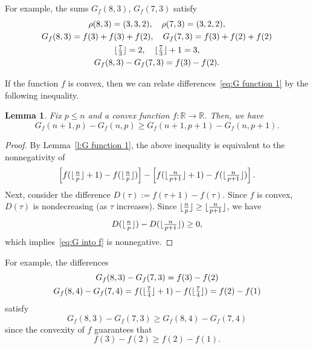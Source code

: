 \documentclass[12pt]{amsart}
\DeclarePairedDelimiter\floor{\lfloor}{\rfloor}
\newtheorem{lem}[thm]{Lemma}
\theoremstyle{definition}
\numberwithin{equation}{section}
\newcommand{\defeq}{:=}
\begin{document}
For example, the sums $G_f(8,3)$, $G_f(7,3)$ satisfy
\begin{equation}
    \begin{gathered}
        \rho(8,3) = (3,3,2), \quad \rho(7,3) = (3,2,2), \\
        G_f(8,3) = f(3) + f(3) + f(2), \quad G_f(7,3) = f(3) + f(2) + f(2) \\
        \floor{\tfrac{7}{3}} = 2, \quad \floor{\tfrac{7}{3}} +1 = 3, \\
        G_f(8,3) - G_f(7,3) = f(3) - f(2).
    \end{gathered}
\end{equation}

If the function $f$ is convex, then we can relate differences~\eqref{eq:G function 1} by the following inequality.

\begin{lem}\label{l:G function 2}
    Fix $p \leq n$ and a convex function $f: \mathbb R \rightarrow \mathbb R$. Then, we have \begin{equation}\label{eq:Delta n increasing}
        G_f(n+1,p) - G_f(n,p) \geq G_f(n+1,p+1)- G_f(n,p+1).
    \end{equation}
\end{lem}

\begin{proof}
    By Lemma~\ref{l:G function 1}, the above inequality is equivalent to the nonnegativity of
    \begin{equation}\label{eq:G into f}
        \left[f(\floor{\tfrac{n}{p}} +1) - f(\floor{\tfrac{n}{p}})\right] - \left[f(\floor{\tfrac{n}{p+1}} +1) - f(\floor{\tfrac{n}{p+1}})\right].
    \end{equation}
    Next, consider the difference $D(\tau) \defeq f(\tau +1) - f(\tau)$. Since $f$ is convex, $D(\tau)$ is nondecreasing (as $\tau$ increases). Since $\floor{\tfrac{n}{p}} \geq \floor{\tfrac{n}{p+1}}$, we have \begin{equation*}
        D(\floor{\tfrac{n}{p}}) - D(\floor{\tfrac{n}{p+1}}) \geq 0,
    \end{equation*}which implies~\eqref{eq:G into f} is nonnegative.
\end{proof}

For example, the differences
\begin{equation*}
    \begin{gathered}
        G_f(8,3) - G_f(7,3) = f(3) - f(2) \\
        G_f(8,4) - G_f(7,4) = f(\floor{\tfrac{7}{4}}+1) -f(\floor{\tfrac{7}{4}}) = f(2) - f(1) \\
    \end{gathered}
\end{equation*}satisfy
\begin{equation*}
    G_f(8,3) - G_f(7,3) \geq G_f(8,4) - G_f(7,4)
\end{equation*} since the convexity of $f$ guarantees that
\begin{equation*}
    f(3) - f(2) \geq f(2) - f(1).
\end{equation*}
\end{document}
